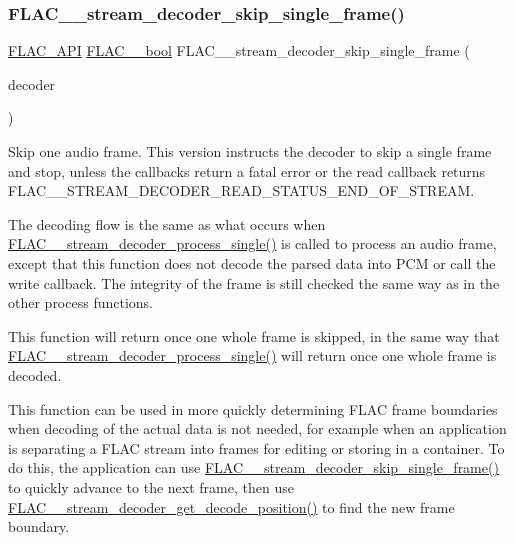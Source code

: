 \subsubsection{\texorpdfstring{FLAC\_\_stream\_decoder\_skip\_single\_frame()}{FLAC\_\_stream\_decoder\_skip\_single\_frame()}}
{\footnotesize\ttfamily \mbox{\hyperlink{group__flac__export_ga56ca07df8a23310707732b1c0007d6f5}{F\+L\+A\+C\+\_\+\+A\+PI}} \mbox{\hyperlink{ordinals_8h_a95103469f1cbd78b8cf250194985b34e}{F\+L\+A\+C\+\_\+\+\_\+bool}} F\+L\+A\+C\+\_\+\+\_\+stream\+\_\+decoder\+\_\+skip\+\_\+single\+\_\+frame (\begin{DoxyParamCaption}\item[{\mbox{\hyperlink{struct_f_l_a_c_____stream_decoder}{F\+L\+A\+C\+\_\+\+\_\+\+Stream\+Decoder}} $\ast$}]{decoder }\end{DoxyParamCaption})}

Skip one audio frame. This version instructs the decoder to \textquotesingle{}skip\textquotesingle{} a single frame and stop, unless the callbacks return a fatal error or the read callback returns {\ttfamily F\+L\+A\+C\+\_\+\+\_\+\+S\+T\+R\+E\+A\+M\+\_\+\+D\+E\+C\+O\+D\+E\+R\+\_\+\+R\+E\+A\+D\+\_\+\+S\+T\+A\+T\+U\+S\+\_\+\+E\+N\+D\+\_\+\+O\+F\+\_\+\+S\+T\+R\+E\+AM}.

The decoding flow is the same as what occurs when \mbox{\hyperlink{group__flac__stream__decoder_ga8c4708eb2c5d99595f64dc2473aa2f42}{F\+L\+A\+C\+\_\+\+\_\+stream\+\_\+decoder\+\_\+process\+\_\+single()}} is called to process an audio frame, except that this function does not decode the parsed data into P\+CM or call the write callback. The integrity of the frame is still checked the same way as in the other process functions.

This function will return once one whole frame is skipped, in the same way that \mbox{\hyperlink{group__flac__stream__decoder_ga8c4708eb2c5d99595f64dc2473aa2f42}{F\+L\+A\+C\+\_\+\+\_\+stream\+\_\+decoder\+\_\+process\+\_\+single()}} will return once one whole frame is decoded.

This function can be used in more quickly determining F\+L\+AC frame boundaries when decoding of the actual data is not needed, for example when an application is separating a F\+L\+AC stream into frames for editing or storing in a container. To do this, the application can use \mbox{\hyperlink{group__flac__stream__decoder_ga371bc2b4f5571e40c47f4db5a8a745f8}{F\+L\+A\+C\+\_\+\+\_\+stream\+\_\+decoder\+\_\+skip\+\_\+single\+\_\+frame()}} to quickly advance to the next frame, then use \mbox{\hyperlink{group__flac__stream__decoder_ga11507d25b6fdbd1efd5ee642923730fa}{F\+L\+A\+C\+\_\+\+\_\+stream\+\_\+decoder\+\_\+get\+\_\+decode\+\_\+position()}} to find the new frame boundary.

